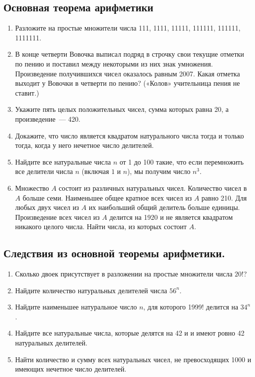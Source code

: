\documentclass[11pt]{article}
\begin{document}
    \subsection*{Основная теорема арифметики}
    \begin{enumerate}[start=34,label={\bfseries \arabic*.}]
        \item Разложите на простые множители числа 111, 1111, 11111, 111111, 111111, 1111111.

        \item  В конце четверти Вовочка выписал подряд в строчку свои текущие отметки по пению и поставил между некоторыми из них знак умножения. Произведение получившихся чисел оказалось равным 2007. Какая отметка выходит у Вовочки в четверти по пению? («Колов» учительница пения не ставит.)

        \item Укажите пять целых положительных чисел, сумма которых равна 20, а произведение~--- 420.

        \item Докажите, что число является квадратом натурального числа тогда и только тогда, когда у него нечетное число делителей.

        \item Найдите все натуральные числа $n$ от 1 до 100 такие, что если перемножить все делители
              числа $n$ (включая $1$ и $n$), мы получим число $n^3$.

        \item Множество $A$ состоит из различных натуральных чисел. Количество чисел в $A$ больше семи. Наименьшее общее кратное всех чисел из  $A$ равно 210. Для любых двух чисел из $A$ их наибольший общий делитель больше единицы. Произведение всех чисел из $A$ делится на 1920 и не является квадратом никакого целого числа.
              Найти числа, из которых состоит $A$.
    \end{enumerate}
    \subsection*{Следствия из основной теоремы арифметики.}
    \begin{enumerate}[start=40,label={\bfseries \arabic*.}]
        \item Сколько двоек присутствует в разложении на простые множители числа $20!$?

        \item Найдите количество натуральных делителей числа $56^n$.

        \item Найдите наименьшее натуральное число $n$, для которого 1999! делится на $34^n$.

        \item Найдите все натуральные числа, которые делятся на 42 и и имеют ровно 42 натуральных делителей.

        \item Найти количество и сумму всех натуральных чисел, не превосходящих 1000 и имеющих нечетное число делителей.
    \end{enumerate}
\end{document}

